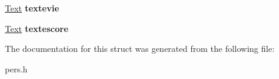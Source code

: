 \begin{DoxyCompactItemize}
\item 
\hyperlink{structText}{Text} {\bfseries textevie}\hypertarget{structpersonnage_a03f93e655fe04eda5335502d977da3fe}{}\label{structpersonnage_a03f93e655fe04eda5335502d977da3fe}

\item 
\hyperlink{structText}{Text} {\bfseries textescore}\hypertarget{structpersonnage_a83dde2407294a3c1ec1167756f5241ea}{}\label{structpersonnage_a83dde2407294a3c1ec1167756f5241ea}

\end{DoxyCompactItemize}


The documentation for this struct was generated from the following file\+:\begin{DoxyCompactItemize}
\item 
pers.\+h\end{DoxyCompactItemize}
